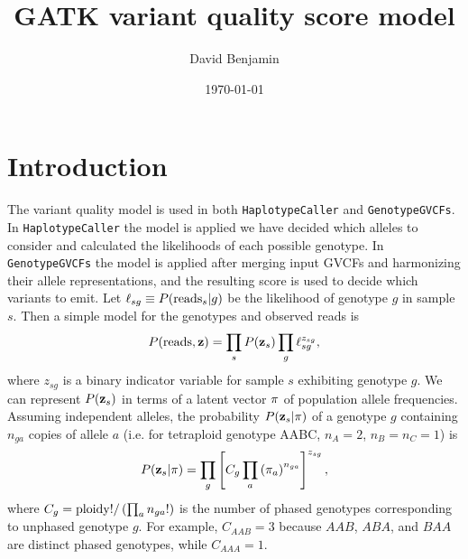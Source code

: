 \documentclass[nofootinbib,amssymb,amsmath]{revtex4}
\newcommand{\vz}{{\bf z}}
\newcommand{\vpi}{{\bf \pi}}
\newcommand{\code}[1]{\texttt{#1}}
\begin{document}
\title{GATK variant quality score model}
\author{David Benjamin}

\date{\today}

\maketitle

\section{Introduction}\label{introduction}

The variant quality model is used in both \code{HaplotypeCaller} and \code{GenotypeGVCFs}.  In \code{HaplotypeCaller} the model is applied we have decided which alleles to consider and calculated the likelihoods of each possible genotype.   In \code{GenotypeGVCFs} the model is applied after merging input GVCFs and harmonizing their allele representations, and the resulting score is used to decide which variants to emit. Let $\ell_{sg} \equiv P({\rm reads}_s | g)$ be the likelihood of genotype $g$ in sample $s$.  Then a simple model for the genotypes and observed reads is
\begin{equation}
P({\rm reads}, \vz) = \prod_s P(\vz_s) \prod_g \ell_{sg}^{z_{sg}}, \label{likelihood}
\end{equation}
where $z_{sg}$ is a binary indicator variable for sample $s$ exhibiting genotype $g$.  We can represent $P(\vz_s)$ in terms of a latent vector $\vpi$ of population allele frequencies.  Assuming independent alleles, the probability $P(\vz_s | \vpi)$ of a genotype $g$ containing $n_{ga}$ copies of allele $a$ (i.e. for tetraploid genotype AABC, $n_A = 2$, $n_B = n_C = 1$) is 
\begin{equation}
P(\vz_s| \vpi) = \prod_g \left[ C_g \prod_a \left( \pi_a \right)^{n_{ga}} \right]^{z_{sg}},
\label{indicator}
\end{equation}
where $C_g = {\rm ploidy}! / \left(\prod_a n_{ga}! \right)$ is the number of phased genotypes corresponding to unphased genotype $g$.  For example, $C_{AAB} = 3$ because $AAB$, $ABA$, and $BAA$ are distinct phased genotypes, while $C_{AAA} = 1$.
\end{document}
